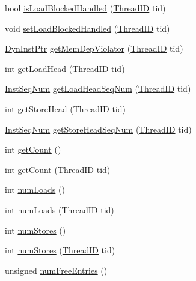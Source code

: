 \begin{DoxyCompactItemize}
bool \hyperlink{classLSQ_a27440751be2f0a382983e7077342f2fe}{isLoadBlockedHandled} (\hyperlink{base_2types_8hh_ab39b1a4f9dad884694c7a74ed69e6a6b}{ThreadID} tid)
\item 
void \hyperlink{classLSQ_a30c462e914644ddba59b0d769941b5dd}{setLoadBlockedHandled} (\hyperlink{base_2types_8hh_ab39b1a4f9dad884694c7a74ed69e6a6b}{ThreadID} tid)
\item 
\hyperlink{classLSQ_a028ce10889c5f6450239d9e9a7347976}{DynInstPtr} \hyperlink{classLSQ_a62fec9ff095a709800a97ac7a3d27c78}{getMemDepViolator} (\hyperlink{base_2types_8hh_ab39b1a4f9dad884694c7a74ed69e6a6b}{ThreadID} tid)
\item 
int \hyperlink{classLSQ_afa7f4e992343baa21a2580e2243e71e0}{getLoadHead} (\hyperlink{base_2types_8hh_ab39b1a4f9dad884694c7a74ed69e6a6b}{ThreadID} tid)
\item 
\hyperlink{inst__seq_8hh_a258d93d98edaedee089435c19ea2ea2e}{InstSeqNum} \hyperlink{classLSQ_a190e0bb202a3dc8a203e18c67b334729}{getLoadHeadSeqNum} (\hyperlink{base_2types_8hh_ab39b1a4f9dad884694c7a74ed69e6a6b}{ThreadID} tid)
\item 
int \hyperlink{classLSQ_a0645614312b9a74b4adb8bc83b4f34ef}{getStoreHead} (\hyperlink{base_2types_8hh_ab39b1a4f9dad884694c7a74ed69e6a6b}{ThreadID} tid)
\item 
\hyperlink{inst__seq_8hh_a258d93d98edaedee089435c19ea2ea2e}{InstSeqNum} \hyperlink{classLSQ_a12f6a1158c09e1531b46d0aafb4e2ae4}{getStoreHeadSeqNum} (\hyperlink{base_2types_8hh_ab39b1a4f9dad884694c7a74ed69e6a6b}{ThreadID} tid)
\item 
int \hyperlink{classLSQ_ae452b1c7e00c383f2916c4a530fab737}{getCount} ()
\item 
int \hyperlink{classLSQ_aa2a7dc807b5a961bae06a5aa5b348448}{getCount} (\hyperlink{base_2types_8hh_ab39b1a4f9dad884694c7a74ed69e6a6b}{ThreadID} tid)
\item 
int \hyperlink{classLSQ_a54460b759fb06e2b18e26657279a6f49}{numLoads} ()
\item 
int \hyperlink{classLSQ_adcdafd05eb96f01fa490a847d57d0bec}{numLoads} (\hyperlink{base_2types_8hh_ab39b1a4f9dad884694c7a74ed69e6a6b}{ThreadID} tid)
\item 
int \hyperlink{classLSQ_aa0fc32a4a9d77696f5907f4d25e7d07f}{numStores} ()
\item 
int \hyperlink{classLSQ_a12346c097127dd67f1f9e8d28e12858f}{numStores} (\hyperlink{base_2types_8hh_ab39b1a4f9dad884694c7a74ed69e6a6b}{ThreadID} tid)
\item 
unsigned \hyperlink{classLSQ_a028971a565aca048c67ea1c36a6a9d51}{numFreeEntries} ()

\end{DoxyCompactItemize}
